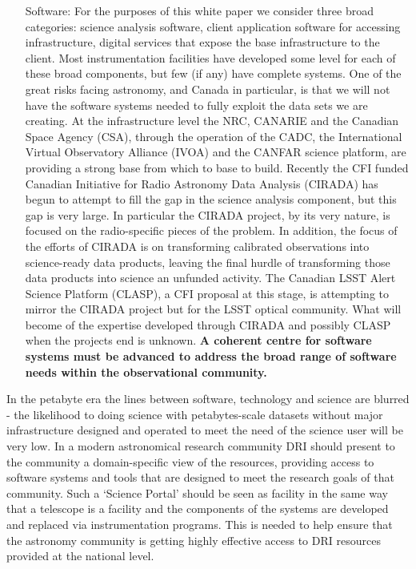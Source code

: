 \documentclass[11pt]{article}
\begin{document}
\begin{itemize}
    \item[Software:] For the purposes of this white paper we consider three broad categories: science analysis software, client application software for accessing infrastructure, digital services that expose the base infrastructure to the client.  Most instrumentation facilities have developed some level for each of these broad components, but few (if any) have  complete systems.  One of the great risks facing astronomy, and Canada in particular, is that we will not have the software systems needed to fully exploit the data sets we are creating.  At the infrastructure level the NRC, CANARIE and the Canadian Space Agency (CSA), through the operation of the CADC, the International Virtual Observatory Alliance (IVOA) and the CANFAR science platform, are providing a strong base from which to base to build.  Recently the CFI funded Canadian Initiative for Radio Astronomy Data Analysis (CIRADA) has begun to attempt to fill the gap in the science analysis component, but this gap is very large.  In particular the CIRADA project, by its very nature, is focused on the radio-specific pieces of the problem.  In addition, the focus of the efforts of CIRADA is on transforming calibrated observations into science-ready data products, leaving the final hurdle of transforming those data products into science an unfunded activity.  The Canadian LSST Alert Science Platform (CLASP), a CFI proposal at this stage, is attempting to mirror the CIRADA project but for the LSST optical community.  What will become of the expertise developed through CIRADA and possibly CLASP when the projects end is unknown. {\bf A coherent centre for software systems must be advanced to address the broad range of software needs within the observational community.}
\end{itemize}

In the petabyte era the lines between software, technology and science are blurred - the likelihood to doing science with petabytes-scale datasets without major infrastructure designed and operated to meet the need of the science user will be very low.  
In a modern astronomical research community DRI should present to the community a domain-specific view of the resources, providing access to software systems and tools that are designed to meet the research goals of that community.  Such a `Science Portal' should be seen as facility in the same way that a telescope is a facility and the components of the systems are developed and replaced via instrumentation programs.  This is needed to help ensure that the astronomy community is getting highly effective access to DRI resources provided at the national level.
\end{document}

